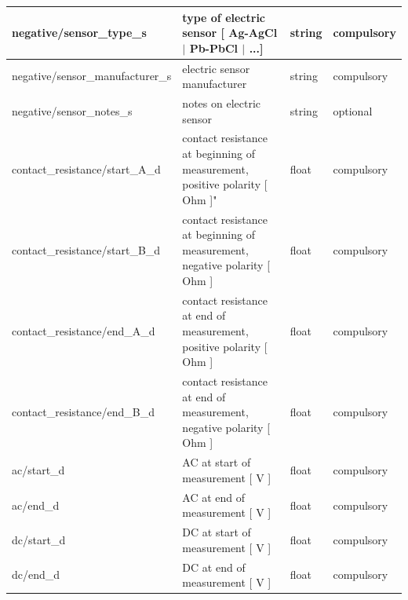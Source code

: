 \documentclass{article}
\begin{document}
\begin{table}[htb!]
\begin{tabular}{|l|p{3in}|l|l|}
		negative/sensor\_type\_s & type of electric sensor [ Ag-AgCl $|$ Pb-PbCl $|$ ...] & string & compulsory \\ \hline
		negative/sensor\_manufacturer\_s & electric sensor manufacturer & string & compulsory \\ \hline
		negative/sensor\_notes\_s & notes on electric sensor & string & optional \\ \hline
		contact\_resistance/start\_A\_d & contact resistance at beginning of measurement, positive polarity [ Ohm ]" & float & compulsory \\ \hline
		contact\_resistance/start\_B\_d & contact resistance at beginning of measurement, negative polarity [ Ohm ] & float & compulsory \\ \hline
		contact\_resistance/end\_A\_d & contact resistance at end of measurement, positive polarity [ Ohm ] & float & compulsory \\ \hline
		contact\_resistance/end\_B\_d & contact resistance at end of measurement, negative polarity [ Ohm ] & float & compulsory \\ \hline
		ac/start\_d & AC at start of measurement [ V ] & float & compulsory \\ \hline
		ac/end\_d & AC at end of measurement [ V ] & float & compulsory \\ \hline
		dc/start\_d & DC at start of measurement [ V ] & float & compulsory \\ \hline
		dc/end\_d & DC at end of measurement [ V ] & float & compulsory \\ \hline
		
	\end{tabular}
	\label{tab:electric01}
\end{table}	
\end{document}
